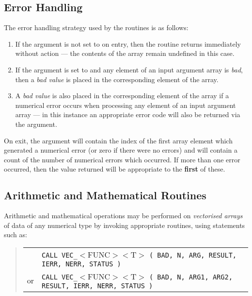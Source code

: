 \subsection{ Error Handling}
\label{section:vec:error}

The error handling strategy used by the  routines is as follows:

\begin{enumerate}

\item If the  argument is not set to  on
entry, then the routine returns immediately without action ---
the contents of the  array remain undefined in this case.

\item If the  argument is set to  and any
element of an input argument array is {\em bad}, then a {\em bad value} is
placed in the corresponding element of the  array.

\item A {\em bad value} is also placed in the corresponding element of the
 array if a numerical error occurs when processing any
element of an input argument array --- in this instance an appropriate
error code will also be returned via the  argument.

\end{enumerate}

On exit, the  argument will contain the index of the first 
array element which generated a numerical error (or zero if there were no 
errors) and  will contain a count of the number of 
numerical errors which occurred.
If more than one error occurred, then the  value returned will
be appropriate to the {\bf first} of these. 

\subsection{ Arithmetic and Mathematical Routines}

Arithmetic and mathematical operations may be performed on {\em vectorised
arrays} of data of any numerical type by invoking appropriate 
routines, using statements such as: 

\begin{quote}
\begin{tabular}{rl}
& \verb#CALL VEC_#$<$FUNC$><$T$>$
\verb#( BAD, N, ARG, RESULT, IERR, NERR, STATUS )#\\
or & \verb#CALL VEC_#$<$FUNC$><$T$>$
\verb#( BAD, N, ARG1, ARG2, RESULT, IERR, NERR, STATUS )#
\end{tabular}
\end{quote}

